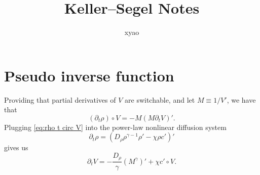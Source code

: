 \documentclass{article}
\title{Keller--Segel Notes}
\author{xyao}
\begin{document}
  \maketitle
  \section{Pseudo inverse function}
  Providing that partial derivatives of $V$ are switchable, and let $M\equiv 1 / V'$, we have that
  \begin{equation}
    \label{eq:rho t circ V}
    (\partial_t\rho)\circ V = -M(M\partial_t V)'.
  \end{equation}
  Plugging \cref{eq:rho t circ V} into the power-law nonlinear diffusion system
  \[
    \partial_t \rho = \left(D_{\rho}\rho^{\gamma - 1}\rho' - \chi\rho c'\right)'
  \]
  gives us
  \[
    \partial_t V = -\frac{D_\rho}{\gamma}(M^\gamma)' + \chi c'\circ V.
  \]
\end{document}
